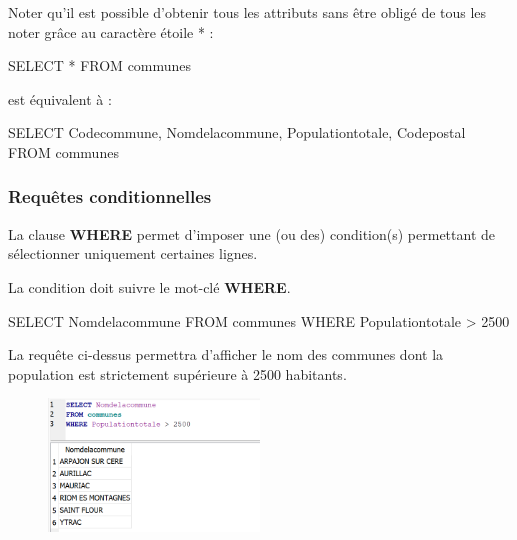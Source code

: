 \documentclass[
  a4paper,
  DIV=11,
  numbers=noendperiod]{scrartcl}
\newenvironment{Shaded}{\begin{snugshade}}{\end{snugshade}}
\newcommand{\DecValTok}[1]{\textcolor[rgb]{0.68,0.00,0.00}{#1}}
\newcommand{\KeywordTok}[1]{\textcolor[rgb]{0.00,0.23,0.31}{#1}}
\newcommand{\NormalTok}[1]{\textcolor[rgb]{0.00,0.23,0.31}{#1}}
\newcommand{\OperatorTok}[1]{\textcolor[rgb]{0.37,0.37,0.37}{#1}}
\begin{document}
Noter qu'il est possible d'obtenir tous les attributs sans être obligé
de tous les noter grâce au caractère étoile * :

\begin{Shaded}
\begin{Highlighting}[]
\KeywordTok{SELECT} \OperatorTok{*}
\KeywordTok{FROM}\NormalTok{ communes}
\end{Highlighting}
\end{Shaded}

est équivalent à :

\begin{Shaded}
\begin{Highlighting}[]
\KeywordTok{SELECT}\NormalTok{  Codecommune, Nomdelacommune, Populationtotale, Codepostal}
\KeywordTok{FROM}\NormalTok{ communes}
\end{Highlighting}
\end{Shaded}

\hypertarget{requuxeates-conditionnelles}{%
\subsubsection{Requêtes
conditionnelles}\label{requuxeates-conditionnelles}}

La clause \textbf{WHERE} permet d'imposer une (ou des) condition(s)
permettant de sélectionner uniquement certaines lignes.

La condition doit suivre le mot-clé \textbf{WHERE}.

\begin{Shaded}
\begin{Highlighting}[]
\KeywordTok{SELECT}\NormalTok{ Nomdelacommune}
\KeywordTok{FROM}\NormalTok{ communes}
\KeywordTok{WHERE}\NormalTok{ Populationtotale }\OperatorTok{\textgreater{}} \DecValTok{2500}
\end{Highlighting}
\end{Shaded}

La requête ci-dessus permettra d'afficher le nom des communes dont la
population est strictement supérieure à 2500 habitants.

\begin{figure}

{\centering \includegraphics[width=0.5\textwidth,height=\textheight]{SQL2.png}

}

\end{figure}
\end{document}
